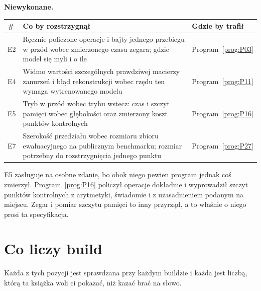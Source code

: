 \medskip
\textbf{Niewykonane.}

\begin{center}
\begin{tabularx}{\linewidth}{@{}lXl@{}}
\toprule
\textbf{\#} & \textbf{Co by rozstrzygnął} & \textbf{Gdzie by trafił} \\
\midrule
E2 & Ręcznie policzone operacje i bajty jednego przebiegu w przód wobec
  zmierzonego czasu zegara; gdzie model się myli i o ile &
  Program~\ref{prog:P03} \\
E4 & Widmo wartości szczególnych prawdziwej macierzy zanurzeń i błąd
  rekonstrukcji wobec rzędu \dash{} ten wymaga wytrenowanego modelu &
  Program~\ref{prog:P11} \\
E5 & Tryb w przód wobec trybu wstecz: czas i szczyt pamięci wobec głębokości
  oraz zmierzony koszt punktów kontrolnych & Program~\ref{prog:P16} \\
E7 & Szerokość przedziału wobec rozmiaru zbioru ewaluacyjnego na publicznym
  benchmarku; rozmiar potrzebny do rozstrzygnięcia jednego punktu &
  Program~\ref{prog:P27} \\
\bottomrule
\end{tabularx}
\end{center}

E5 zasługuje na osobne zdanie, bo obok niego pewien program jednak coś
zmierzył. Program~\ref{prog:P16} policzył operacje dokładnie i wyprowadził
szczyt punktów kontrolnych z arytmetyki, świadomie i z uzasadnieniem podanym
na miejscu. Zegar i pomiar szczytu pamięci to inny przyrząd, a to właśnie o
niego prosi ta specyfikacja.
\section{Co liczy build}
\label{sec:F-ledgers}

Każda z tych pozycji jest sprawdzana przy każdym buildzie i każda jest liczbą,
którą ta książka woli ci pokazać, niż kazać brać na słowo.

